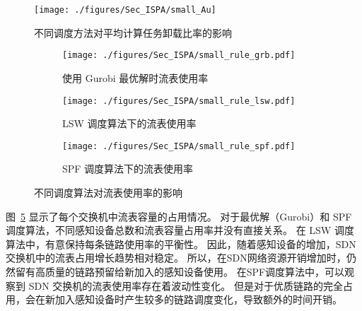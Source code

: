 \begin{figure}[!h]
  \centering
  \texttt{[image: ./figures/Sec\_ISPA/small\_Au]}
  \caption{不同调度方法对平均计算任务卸载比率的影响}
  \label{fig_smallAu}
\end{figure}
\vspace{-0.5em}


\begin{figure}[!h]
  \centering
  \begin{subfigure}[h]{0.99\linewidth}
    \centering
    \texttt{[image: ./figures/Sec\_ISPA/small\_rule\_grb.pdf]}
    \label{fig_smallNetworkRG}
    \vspace{-0.5em}
    \caption{使用 Gurobi 最优解时流表使用率}
  \end{subfigure}
  \begin{subfigure}[h]{0.99\linewidth}
    \centering
    \texttt{[image: ./figures/Sec\_ISPA/small\_rule\_lsw.pdf]}
    \label{fig_smallNetworkRL}
    \vspace{-0.5em}
    \caption{LSW 调度算法下的流表使用率}
  \end{subfigure}
  \begin{subfigure}[h]{0.99\linewidth}
    \centering
    \texttt{[image: ./figures/Sec\_ISPA/small\_rule\_spf.pdf]}
    \label{fig_smallNetworkRS}
    \vspace{-0.5em}
    \caption{SPF 调度算法下的流表使用率}
  \end{subfigure}
  \vspace{-0.5em}
  \caption{不同调度算法对流表使用率的影响}
\label{fig_smallrule}
\end{figure}

图~\ref{fig_smallrule} 显示了每个交换机中流表容量的占用情况。
对于最优解（Gurobi）和 SPF 调度算法，不同感知设备总数和流表容量占用率并没有直接关系。
在 LSW 调度算法中，有意保持每条链路使用率的平衡性。
因此，随着感知设备的增加，SDN 交换机中的流表占用增长趋势相对稳定。
所以，在SDN网络资源开销增加时，仍然留有高质量的链路预留给新加入的感知设备使用。
在SPF调度算法中，可以观察到 SDN 交换机的流表使用率存在着波动性变化。
但是对于优质链路的完全占用，会在新加入感知设备时产生较多的链路调度变化，导致额外的时间开销。

